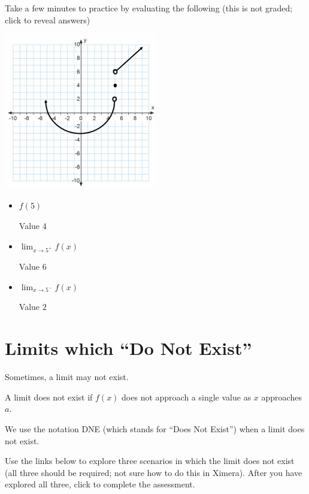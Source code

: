 \documentclass{ximera}
\begin{document}
Take a few minutes to practice by evaluating the following (this is not graded; click to reveal answers)

\begin{image}
\includegraphics[width=0.5\textwidth]{graph2.png}
\end{image}

\begin{itemize}
    \item $f(5)$
    \begin{expandable}
        Value $4$
    \end{expandable}
    \item $\lim_{x \to 5^+} f(x)$
    \begin{foldable}
        Value $6$
    \end{foldable}
    \item $\lim_{x \to 5^-} f(x)$
    \begin{expandable}
        Value $2$
    \end{expandable}
\end{itemize}

\section{Limits which ``Do Not Exist''}

Sometimes, a limit may not exist.

\begin{explanation}
    A limit does not exist if $f(x)$ does not approach a single value as $x$ approaches $a$.
\end{explanation}

We use the notation DNE (which stands for ``Does Not Exist'') when a limit does not exist.

Use the links below to explore three scenarios in which the limit does not exist (all three should be required; not sure how to do this in Ximera). After you have explored all three, click to complete the assessment.
\end{document}
